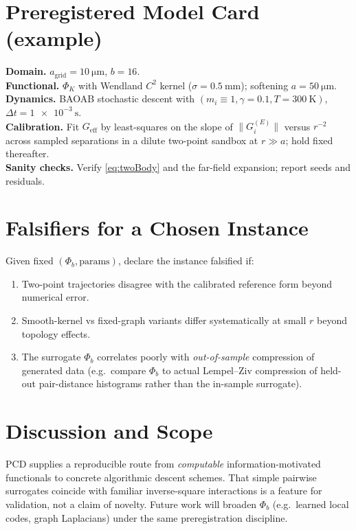 \documentclass[11pt,a4paper]{article}
\numberwithin{equation}{section}
\begin{document}
\section{Preregistered Model Card (example)}
\textbf{Domain.} $a_{\text{grid}}=\SI{10}{\micro\meter}$, $b=16$.\\
\textbf{Functional.} $\Phi_K$ with Wendland $C^2$ kernel ($\sigma=\SI{0.5}{\milli\meter}$); softening $a=\SI{50}{\micro\meter}$.\\
\textbf{Dynamics.} BAOAB stochastic descent with $(m_i\equiv 1,\gamma=0.1,T=\SI{300}{\kelvin})$, $\Delta t=\SI{1e-3}{\second}$.\\
\textbf{Calibration.} Fit $G_{\text{eff}}$ by least-squares on the slope of $\lVert G^{(E)}_i\rVert$ versus $r^{-2}$ across sampled separations in a dilute two-point sandbox at $r\gg a$; hold fixed thereafter.\\
\textbf{Sanity checks.} Verify \eqref{eq:twoBody} and the far-field expansion; report seeds and residuals.

\section{Falsifiers for a Chosen Instance}
Given fixed $(\Phi_b,\text{params})$, declare the instance falsified if:
\begin{enumerate}[label=(F\arabic*)]
\item Two-point trajectories disagree with the calibrated reference form beyond numerical error.
\item Smooth-kernel vs fixed-graph variants differ systematically at small $r$ beyond topology effects.
\item The surrogate $\Phi_b$ correlates poorly with \emph{out-of-sample} compression of generated data (e.g.\ compare $\Phi_b$ to actual Lempel--Ziv compression of held-out pair-distance histograms rather than the in-sample surrogate).
\end{enumerate}

\section{Discussion and Scope}
PCD supplies a reproducible route from \emph{computable} information-motivated functionals to concrete algorithmic descent schemes. That simple pairwise surrogates coincide with familiar inverse-square interactions is a feature for validation, not a claim of novelty. Future work will broaden $\Phi_b$ (e.g.\ learned local codes, graph Laplacians) under the same preregistration discipline.
\end{document}
